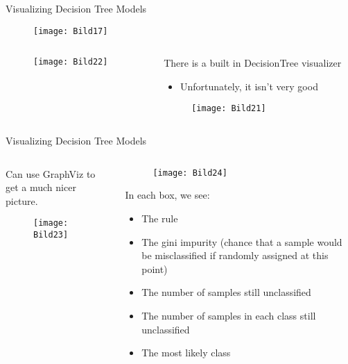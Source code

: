 \documentclass[aspectratio=169]{../latex_main/tntbeamer}  %
\begin{document}
	
	\begin{frame}{Visualizing Decision Tree Models }
	    \begin{figure}
	        \centering
	        \texttt{[image: Bild17]}
	    \end{figure}
	    \begin{columns}
	        \begin{column}{.5\textwidth}
	                \begin{figure}
	                    \texttt{[image: Bild22]}
	                \end{figure}
	        \end{column}
	        
	        
	        \begin{column}{.5\textwidth}
	                There is a built in DecisionTree visualizer
	                \begin{itemize}
	                    \item Unfortunately, it isn’t very good
	                \end{itemize}
	                \begin{figure}
	                    \texttt{[image: Bild21]}
	                \end{figure}
	        \end{column}
	    \end{columns}
	\end{frame}
	
	
	\begin{frame}{Visualizing Decision Tree Models }
	    \begin{columns}
	        \begin{column}{.4\textwidth}
	        Can use GraphViz to get a much nicer picture.
	                \begin{figure}
	                    \texttt{[image: Bild23]}
	                \end{figure}
	        \end{column}
	        
	        
	        \begin{column}{.6\textwidth}
	                \begin{figure}
	                    \texttt{[image: Bild24]}
	                \end{figure}
	                In each box, we see:
	                \begin{itemize}
	                    \item The rule
	                    \item The gini impurity (chance that a sample would be misclassified if randomly assigned at this point)
	                    \item The number of samples still unclassified
	                    \item The number of samples in each class still unclassified
	                    \item The most likely class
	                \end{itemize}
	        \end{column}
	    \end{columns}
	\end{frame}
	
\end{document}
